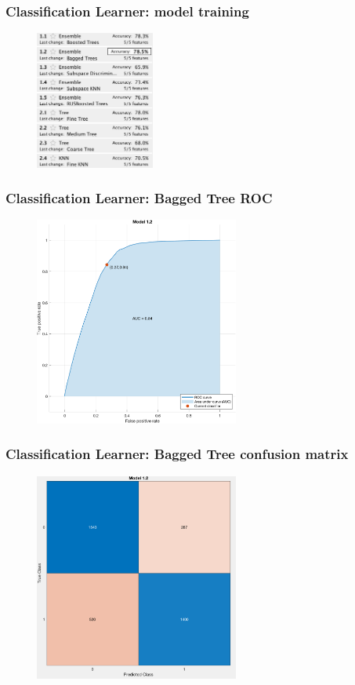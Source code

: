 \documentclass{beamer}
\begin{document}
\begin{frame}
    \frametitle{Classification Learner: model training}
    \begin{figure}
    	\centering
    	\includegraphics[width=0.35\textwidth]{modelstrained_small}
    \end{figure}
\end{frame}

\begin{frame}
    \frametitle{Classification Learner: Bagged Tree ROC}
    \begin{figure}
    	\centering
    	\includegraphics[width=0.6\textwidth]{cl_2_roc}
    \end{figure}
\end{frame}

\begin{frame}
    \frametitle{Classification Learner: Bagged Tree confusion matrix}
    \begin{figure}
    	\centering
    	\includegraphics[width=0.6\textwidth]{cl_2_confusion}
    \end{figure}
\end{frame}
\end{document}
